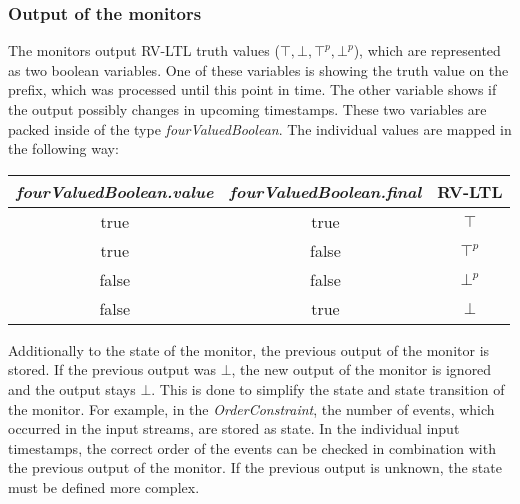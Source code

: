 \subsubsection{Output of the  monitors}
	The monitors output RV-LTL truth values ($\top, \bot, \top^p, \bot^p$), which are represented as two boolean variables. One of these variables is showing the truth value on the prefix, which was processed until this point in time. The other variable shows if the output possibly changes in upcoming timestamps. These two variables are packed inside of the type \textit{fourValuedBoolean}. The individual values are mapped in the following way: 
	\begin{table}[H]
		\begin{tabular}{|c|c|c|}
			\hline
			\textit{fourValuedBoolean.value} & \textit{fourValuedBoolean.final} & RV-LTL \\
			\hline
			true & true &  $\top$\\
			\hline
			true & false &  $\top^p$\\
			\hline
			false & false & $\bot^p$ \\
			\hline
			false & true &  $\bot$\\
			\hline
		\end{tabular}
		\centering
	\end{table}
	Additionally to the state of the monitor, the previous output of the monitor is stored. If the previous output was $\bot$, the new output of the monitor is ignored and the output stays $\bot$. This is done to simplify the state and state transition of the monitor. For example, in the \textit{OrderConstraint}, the number of events, which occurred in the input streams, are stored as state. In the individual input timestamps, the correct order of the events can be checked in combination with the previous output of the monitor. If the previous output is unknown, the state must be defined more complex.
	 
